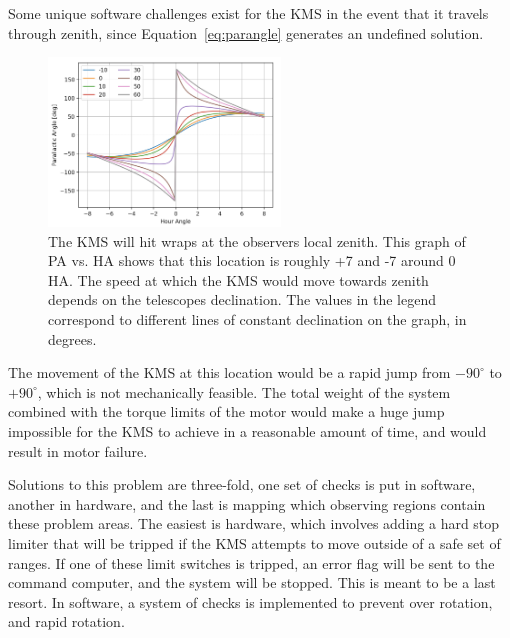 \documentclass[manuscript]{aastex}
\begin{document}
Some unique software challenges exist for the KMS in the event that it travels through zenith, since Equation~\ref{eq:parangle} generates an undefined solution.  
\begin{figure}
\vspace{-0.8cm}
  \begin{center}
    \includegraphics[width=0.55\textwidth]{km6.png}
  \end{center}
  \caption[Parallactic Angle Versus Hour Angle]{The KMS will hit wraps at the observers local zenith. This graph of PA vs. HA shows that this location is roughly +7 and -7 around 0 HA. The speed at which the KMS would move towards zenith depends on the telescopes declination. The values in the legend correspond to different lines of constant declination on the graph, in degrees.}
  \label{fig:km6}
\end{figure}
The movement of the KMS at this location would be a rapid jump from $- 90^{\circ}$ to $+ 90^{\circ}$, which is not mechanically feasible. The total weight of the system combined with the torque limits of the motor would make a huge jump impossible for the KMS to achieve in a reasonable amount of time, and would result in motor failure. 

Solutions to this problem are three-fold, one set of checks is put in software, another in hardware, and the last is mapping which observing regions contain these problem areas. The easiest is hardware, which involves adding a hard stop limiter that will be tripped if the KMS attempts to move outside of a safe set of ranges. If one of these limit switches is tripped, an error flag will be sent to the command computer, and the system will be stopped. This is meant to be a last resort. In software, a system of checks is implemented to prevent over rotation, and rapid rotation.
\end{document}
